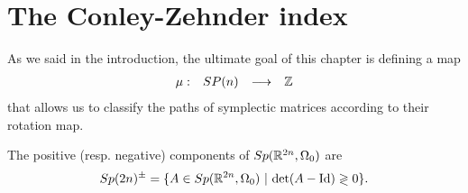 \section{The Conley-Zehnder index}

As we said in the introduction, the ultimate goal of this chapter is defining a map
\[\begin{array}{rccc} \mu : & SP(n) & \longrightarrow & \mathbb{Z} \end{array}\]
that allows us to classify the paths of symplectic matrices according to their rotation map.

\begin{deff} The positive (resp. negative) components of $Sp(\mathbb{R}^{2n},\Omega_0)$ are
\[Sp(2n)^{\pm} = \{A \in Sp(\R^{2n},\Omega_0) \ | \ \text{det}(A - \text{Id}) \gtrless 0 \} .\]
\end{deff}

